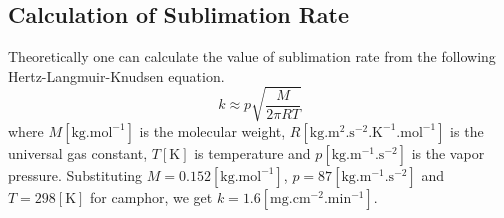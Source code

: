 \documentclass[12pt]{article}
\begin{document}
\subsection{Calculation of Sublimation Rate}
Theoretically one can calculate the value of sublimation rate from the following Hertz-Langmuir-Knudsen equation.
\begin{equation}
k \approx p\sqrt{\frac{M}{2\pi R T}}
\end{equation}
where $M\left[\mathrm{kg.mol^{-1}}\right]$ is the molecular weight, $R\left[\mathrm{kg.m^{2}.s^{-2}.K^{-1}.mol^{-1}}\right]$ is the universal gas constant, $T\left[\mathrm{K}\right]$ is temperature and $p\left[\mathrm{kg.m^{-1}.s^{-2}}\right]$ is the vapor pressure. Substituting $M = 0.152 \left[\mathrm{kg.mol^{-1}}\right]$, $p = 87 \left[\mathrm{kg.m^{-1}.s^{-2}}\right]$ and $T = 298 \left[\mathrm{K}\right]$ for camphor, we get $k = 1.6 \left[\mathrm{mg.cm^{-2}.min^{-1}}\right]$.

\end{document}
